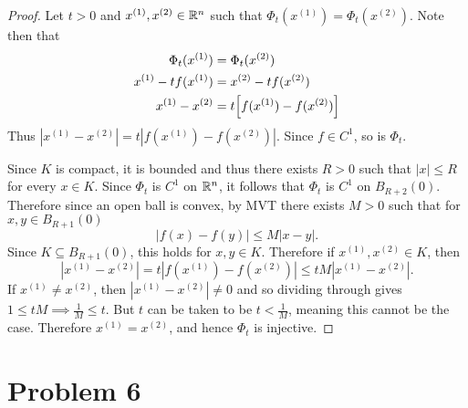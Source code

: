 \documentclass{eeleyes}
\begin{document}
\begin{proof}
    Let $t > 0$ and $x^{(1)}, x^{(2)} \in \mathbb{R}^n$ such that $\Phi_t(x^{(1)}) = \Phi_t(x^{(2)})$. Note then that
    \begin{align*}
        \Phi_t(x^{(1)}) &= \Phi_t(x^{(2)}) \\ 
        x^{(1)} - t f(x^{(1)}) &= x^{(2)} - t f(x^{(2)}) \\
        x^{(1)} - x^{(2)} &= t \qty[f(x^{(1)}) - f(x^{(2)})]
    \end{align*}
    Thus $|x^{(1)} - x^{(2)}| = t |f(x^{(1)}) - f(x^{(2)})|$. Since $f \in C^1$, so is $\Phi_t$.

    Since $K$ is compact, it is bounded and thus there exists $R > 0$ such that $|x| \leq R$ for every $x \in K$. Since $\Phi_t$ is $C^1$ on $\mathbb{R}^n$, it follows that $\Phi_t$ is $C^1$ on $B_{R+2}(0)$. Therefore since an open ball is convex, by MVT there exists $M > 0$ such that for $x,y \in B_{R + 1}(0)$
    \[
        |f(x) - f(y)| \leq M |x - y|
    .\]
    Since $K \subseteq B_{R+1}(0)$, this holds for $x,y \in K$. Therefore if $x^{(1)}, x^{(2)} \in K$, then
    \[
        |x^{(1)} - x^{(2)}| = t |f(x^{(1)}) - f(x^{(2)})| \leq tM |x^{(1)} - x^{(2)}|
    .\]
    If $x^{(1)} \neq x^{(2)}$, then $|x^{(1)} - x^{(2)}| \neq 0$ and so dividing through gives $1 \leq tM \implies \frac{1}{M} \leq t$. But $t$ can be taken to be $t < \frac{1}{M}$, meaning this cannot be the case. Therefore $x^{(1)} = x^{(2)}$, and hence $\Phi_t$ is injective.

\end{proof}


\section*{Problem 6}
\end{document}
